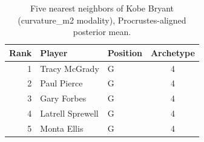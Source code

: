 \begin{table}[htbp]
  \centering\small
  \begin{tabular}{rllc}
    \toprule
    Rank & Player & Position & Archetype \\
    \midrule
    1 & Tracy McGrady & G & 4 \\
    2 & Paul Pierce & G & 4 \\
    3 & Gary Forbes & G & 4 \\
    4 & Latrell Sprewell & G & 4 \\
    5 & Monta Ellis & G & 4 \\
    \bottomrule
  \end{tabular}
  \caption{Five nearest neighbors of Kobe Bryant (curvature_m2 modality), Procrustes-aligned posterior mean.}
  \label{tab:Kobe_Bryant_neighbors_curvature_m2}
\end{table}

